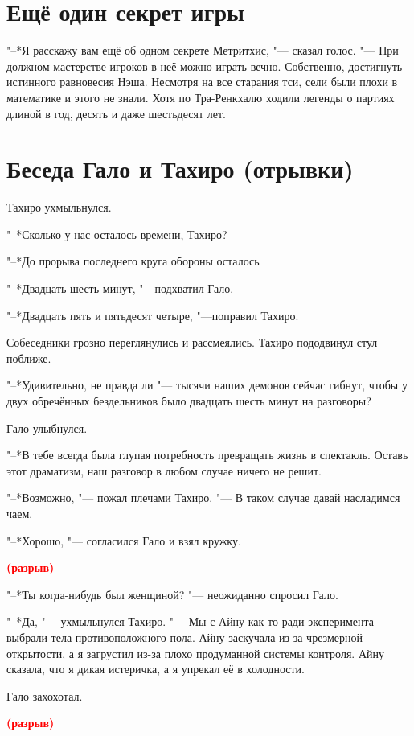 \documentclass[a4paper,10pt]{book}
\newcommand{\ldotst}{\so{...}\xspace}
\newcommand{\spacing}{\textcolor{red}{\textbf{(разрыв)}}}
\begin{document}
\section{Ещё один секрет игры}

"--*Я расскажу вам ещё об одном секрете Метритхис, "--- сказал голос. "--- При 
должном мастерстве игроков в неё можно играть вечно. Собственно, достигнуть 
истинного равновесия Нэша. Несмотря на все старания тси, сели были плохи в 
математике и этого не знали. Хотя по Тра-Ренкхалю ходили легенды о партиях 
длиной в год, десять и даже шестьдесят лет.

\section{Беседа Гало и Тахиро (отрывки)}

Тахиро ухмыльнулся.

"--*Сколько у нас осталось времени, Тахиро?

"--*До прорыва последнего круга обороны осталось\ldotst

"--*Двадцать шесть минут, "---подхватил Гало.

"--*Двадцать пять и пятьдесят четыре, "---поправил Тахиро.

Собеседники грозно переглянулись и рассмеялись. Тахиро пододвинул стул поближе.

"--*Удивительно, не правда ли "--- тысячи наших демонов сейчас гибнут, чтобы у 
двух обречённых бездельников было двадцать шесть минут на разговоры?

Гало улыбнулся.

"--*В тебе всегда была глупая потребность превращать жизнь в спектакль. Оставь 
этот драматизм, наш разговор в любом случае ничего не решит.

"--*Возможно, "--- пожал плечами Тахиро. "--- В таком случае давай насладимся 
чаем.

"--*Хорошо, "--- согласился Гало и взял кружку.

\spacing

"--*Ты когда-нибудь был женщиной? "--- неожиданно спросил Гало.

"--*Да, "--- ухмыльнулся Тахиро. "--- Мы с Айну как-то ради эксперимента 
выбрали тела противоположного пола. Айну заскучала из-за чрезмерной открытости, 
а я загрустил из-за плохо продуманной системы контроля. Айну сказала, что я 
дикая истеричка, а я упрекал её в холодности.

Гало захохотал.

\spacing
\end{document}
